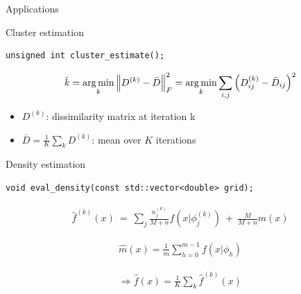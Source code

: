 \begin{frame}[c]
	\begin{center}
		\huge \color{blue} Applications
	\end{center}
\end{frame}


\begin{frame}[fragile]{Cluster estimation}


\begin{verbatim}
unsigned int cluster_estimate();
\end{verbatim}

$$ \hat{k} = \operatorname*{arg\,min}_k \left \lVert D^{(k)} - \bar D \right\rVert_F^2= \operatorname*{arg\,min}_k \sum_{i,j} \left( D^{(k)}_{ij} - \bar{D}_{ij}  \right)^2$$


\begin{itemize}

\item $D^{(k)}$: dissimilarity matrix  at iteration k \\

\item $\bar D= \frac{1}{K} \sum_k D^{(k)} $: mean over $K$ iterations
\end{itemize}

\end{frame}

\begin{frame}[fragile]{Density estimation}


\begin{verbatim}
void eval_density(const std::vector<double> grid);
\end{verbatim}

\begin{equation}
	\begin{aligned} \nonumber
	\hat f^{(k)}(x) \ = \ \sum_j \frac{n^{(k)}_j}{M+n} f\left(x | \phi^{(k)}_j\right) \ + \ \frac{M}{M+n} m(x)
	\end{aligned}
\end{equation}

\begin{equation}
	\begin{aligned} \nonumber
		\hat m(x) = \frac{1}{m} \sum_{h=0}^{m-1}  f\left(x | \phi_h\right)
	\end{aligned}
\end{equation}

\begin{equation}
	\begin{aligned} \nonumber
 \Longrightarrow \hat f(x) = \frac{1}{K} \sum_k \hat f^{(k)}(x) 
\end{aligned}
\end{equation}

\end{frame}

